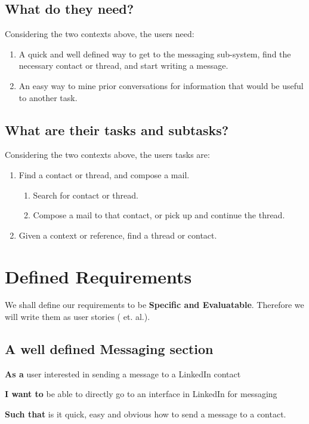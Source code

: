 \documentclass[
	letterpaper, %
]{jdf}
\begin{document}
\subsection{What do they need?}
Considering the two contexts above, the users need:
\begin{enumerate}
    \item A quick and well defined way to get to the messaging sub-system, find the necessary contact or thread, and start writing a message.
    \item An easy way to mine prior conversations for information that would be useful to another task.
\end{enumerate}


\subsection{What are their tasks and subtasks?}
Considering the two contexts above, the users tasks are:
\begin{enumerate}
    \item Find a contact or thread, and compose a mail.
    \begin{enumerate}
        \item Search for contact or thread.
        \item Compose a mail to that contact, or pick up and continue the thread.
    \end{enumerate}
    \item Given a context or reference, find a thread or contact.

\end{enumerate}

\section{Defined Requirements}
We shall define our requirements to be \textbf{Specific and Evaluatable}. Therefore we will write them as user stories (\cite{cohn} et. al.).

\subsection{A well defined Messaging section}

\textbf{As a} user interested in sending a message to a LinkedIn contact

\textbf{I want to} be able to directly go to an interface in LinkedIn for messaging

\textbf{Such that} is it quick, easy and obvious how to send a message to a contact.
\end{document}
